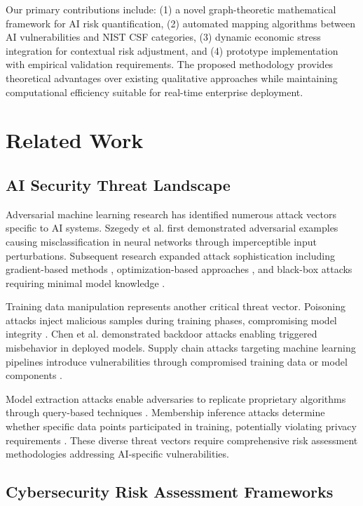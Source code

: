 \documentclass[11pt,letterpaper]{article}
\begin{document}
Our primary contributions include: (1) a novel graph-theoretic mathematical framework for AI risk quantification, (2) automated mapping algorithms between AI vulnerabilities and NIST CSF categories, (3) dynamic economic stress integration for contextual risk adjustment, and (4) prototype implementation with empirical validation requirements. The proposed methodology provides theoretical advantages over existing qualitative approaches while maintaining computational efficiency suitable for real-time enterprise deployment.

\section{Related Work}

\subsection{AI Security Threat Landscape}

Adversarial machine learning research has identified numerous attack vectors specific to AI systems. Szegedy et al. \cite{Szegedy2013} first demonstrated adversarial examples causing misclassification in neural networks through imperceptible input perturbations. Subsequent research expanded attack sophistication including gradient-based methods \cite{Goodfellow2014}, optimization-based approaches \cite{Carlini2017}, and black-box attacks requiring minimal model knowledge \cite{Papernot2017}.

Training data manipulation represents another critical threat vector. Poisoning attacks inject malicious samples during training phases, compromising model integrity \cite{Biggio2012}. Chen et al. \cite{Chen2017} demonstrated backdoor attacks enabling triggered misbehavior in deployed models. Supply chain attacks targeting machine learning pipelines introduce vulnerabilities through compromised training data or model components \cite{Gu2017}.

Model extraction attacks enable adversaries to replicate proprietary algorithms through query-based techniques \cite{Tramer2016}. Membership inference attacks determine whether specific data points participated in training, potentially violating privacy requirements \cite{Shokri2017}. These diverse threat vectors require comprehensive risk assessment methodologies addressing AI-specific vulnerabilities.

\subsection{Cybersecurity Risk Assessment Frameworks}
\end{document}
